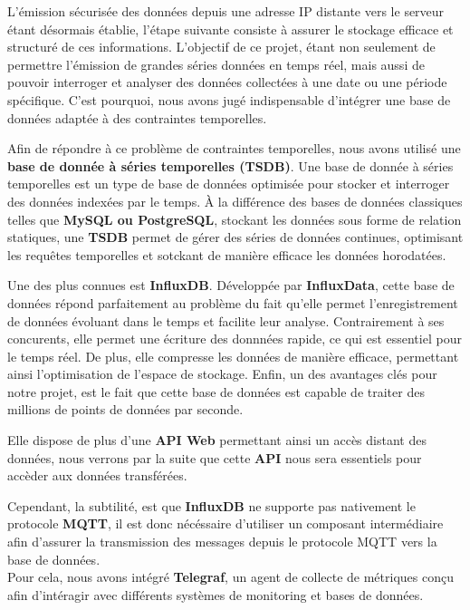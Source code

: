 \documentclass[10pt, a4paper]{report}
\begin{document}
	L'émission sécurisée des données depuis une adresse IP distante vers le serveur étant désormais établie, l'étape suivante consiste à assurer le stockage efficace et structuré de ces informations. L'objectif de ce projet, étant non seulement de permettre l'émission de grandes séries données en temps réel, mais aussi de pouvoir interroger et analyser des données collectées à une date ou une période spécifique. C'est pourquoi, nous avons jugé indispensable d'intégrer une base de données adaptée à des contraintes temporelles.
	
	Afin de répondre à ce problème de contraintes temporelles, nous avons utilisé une \textbf{base de donnée à séries temporelles (TSDB)}. Une base de donnée à séries temporelles est un type de base de données optimisée pour stocker et interroger des données indexées par le temps. À la différence des bases de données classiques telles que \textbf{MySQL ou PostgreSQL}, stockant les données sous forme de relation statiques, une \textbf{TSDB} permet de gérer des séries de données continues, optimisant les requêtes temporelles et sotckant de manière efficace les données horodatées.
	
	Une des plus connues est \textbf{InfluxDB}. Développée par \textbf{InfluxData}, cette base de données répond parfaitement au problème du fait qu'elle permet l'enregistrement de données évoluant dans le temps et facilite leur analyse. Contrairement à ses concurents, elle permet une écriture des donnnées rapide, ce qui est essentiel pour le temps réel. De plus, elle compresse les données de manière efficace, permettant ainsi l'optimisation de l'espace de stockage. Enfin, un des avantages clés pour notre projet, est le fait que cette base de données est capable de traiter des millions de points de données par seconde.
	
	Elle dispose de plus d'une \textbf{API Web} permettant ainsi un accès distant des données, nous verrons par la suite que cette \textbf{API} nous sera essentiels pour accèder aux données transférées.
	
	Cependant, la subtilité, est que \textbf{InfluxDB} ne supporte pas nativement le protocole \textbf{MQTT}, il est donc nécéssaire d'utiliser un composant intermédiaire afin d'assurer la transmission des messages depuis le protocole MQTT vers la base de données.\\
	Pour cela, nous avons intégré \textbf{Telegraf}, un agent de collecte de métriques conçu afin d'intéragir avec différents systèmes de monitoring et bases de données.
	
\end{document}

